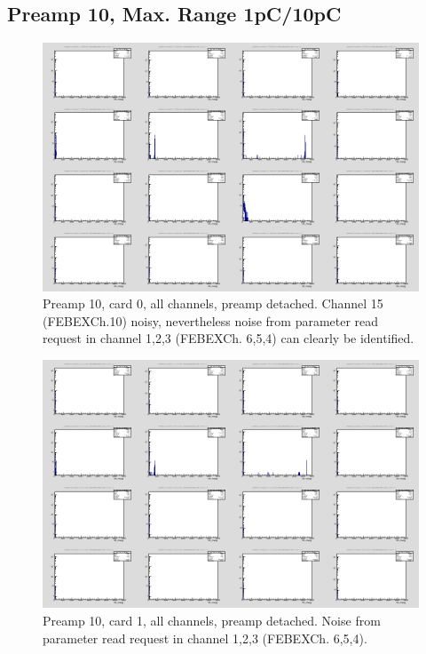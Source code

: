 \documentclass{report}
\begin{document}
\newpage
\clearpage

\subsection{Preamp 10, Max. Range 1pC/10pC}
\begin{figure}[!htb]
  \includegraphics[width=\linewidth]{rc_bus_test/preamp10_card0_gamma_all.png}
  \caption{Preamp 10, card 0, all channels, preamp detached. Channel 15 (FEBEXCh.10)  noisy, nevertheless noise from parameter read request in channel 1,2,3 (FEBEXCh. 6,5,4) can clearly be identified.}
\end{figure}
\begin{figure}[!htb]
  \includegraphics[width=\linewidth]{rc_bus_test/preamp10_card1_gamma_all.png}
  \caption{Preamp 10, card 1, all channels, preamp detached. Noise from parameter read request in channel 1,2,3 (FEBEXCh. 6,5,4).}
\end{figure}
\end{document}
